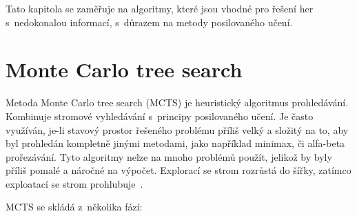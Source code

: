Tato kapitola se zaměřuje na algoritmy, které jsou vhodné pro řešení her s~nedokonalou informací, s~důrazem na metody posilovaného učení.

\section{Monte Carlo tree search}\label{subsec:monte-carlo-tree-search}
Metoda Monte Carlo tree search (MCTS) je heuristický algoritmus prohledávání.
Kombinuje stromové vyhledávání s~principy posilovaného učení.
Je často využíván, je-li stavový prostor řešeného problému příliš velký a složitý na to, aby byl prohledán kompletně jinými metodami, jako například minimax, či alfa-beta prořezávání.
Tyto  algoritmy nelze na mnoho problémů použít, jelikož by byly příliš pomalé a náročné na výpočet.
Explorací se strom rozrůstá do šířky, zatímco exploatací se strom prohlubuje~\cite{mcts_geeksforgeeks}.

MCTS se skládá z~několika fází:

